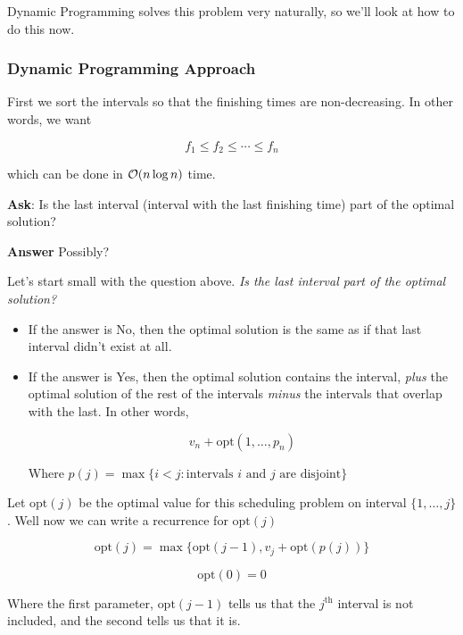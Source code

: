 \documentclass[12pt]{article}
\def\opt{\text{opt}}
\begin{document}
  Dynamic Programming solves this problem very naturally, so we'll look at how
  to do this now.

  \subsubsection{Dynamic Programming Approach}

  First we sort the intervals so that the finishing times are non-decreasing. In
  other words, we want

  \[
    f_1 \le f_2 \le \cdots \le f_n
  \]

  which can be done in $\mathcal O(n \log n)$ time.


  {\bf Ask}: Is the last interval (interval with the last finishing time) part
  of the optimal solution?

  {\bf Answer} Possibly?


  Let's start small with the question above. {\it Is the last interval part of
  the optimal solution?}

  \begin{itemize}
    \item If the answer is No, then the optimal solution is the same as if that
      last interval didn't exist at all.

    \item If the answer is Yes, then the optimal solution contains the interval,
      {\it plus} the optimal solution of the rest of the intervals {\it minus}
      the intervals that overlap with the last. In other words,

      \[
        v_n + \opt(1, \dots, p_n)
      \]

      Where $p(j) = \max\{i < j : \text{intervals $i$ and $j$ are disjoint}\}$
  \end{itemize}
  
  Let $\opt(j)$ be the optimal value for this scheduling problem on interval
  $\{1, \dots, j\}$. Well now we can write a recurrence for $\opt(j)$

  \[
    \opt(j) = \max\{\opt(j - 1), v_j + \opt(p(j))\}
  \]

  \[
    \opt(0) = 0
  \]

  Where the first parameter, $\opt(j - 1)$ tells us that the $j^\text{th}$
  interval is not included, and the second tells us that it is.
\end{document}

